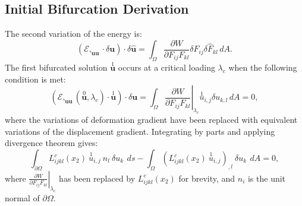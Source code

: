 \documentclass[11pt]{report}
\begin{document}
\begin{appendices}
  \chapter{Initial Bifurcation Derivation} \label{append_first_sol}

The second variation of the energy is:
\begin{equation} \label{eq:second_var}
(\mathcal{E},_{\mathbf{u} \mathbf{u}}\cdot \delta\mathbf{u}) \cdot \delta\hat{\mathbf{u}} = \int_\Omega  \frac{\partial W}{\partial F_{ij} F_{kl}} \delta F_{ij} \delta \hat{F}_{kl} \,dA.
\end{equation}
The first bifurcated solution $\overset{1}{\mathbf{u}}$ occurs at a critical loading $\lambda_c$ when the following condition is met:
\begin{equation}
(\mathcal{E},_{\mathbf{u} \mathbf{u}}(\overset{0}{\mathbf{u}}, \lambda_c) \cdot \overset{1}{\mathbf{u}}) \cdot \delta\mathbf{u} = \int_\Omega  \left. \frac{\partial W}{\partial F_{ij} F_{kl}} \right |_{\lambda_c} \overset{1}{u}_{i,j} \delta u_{k,l} \,dA = 0,
\end{equation}
where the variations of deformation gradient have been replaced with equivalent variations of the displacement gradient. Integrating by parts and applying divergence theorem gives:
\begin{equation} \label{eq:byparts}
\int_{\partial \Omega} L^c_{ijkl}(x_2) \: \overset{1}{u}_{i,j} \: n_l \:  \delta u_k \: \,ds - \int_{\Omega} \left ( L^c_{ijkl}(x_2) \: \overset{1}{u}_{i,j} \right )_{,l} \: \delta u_k \: \,dA = 0,
\end{equation}
where $\left. \frac{\partial W}{\partial F_{ij} F_{kl}} \right |_{\lambda_c}$ has been replaced by $L^c_{ijkl}(x_2)$ for brevity, and $n_{i}$ is the unit normal of $\partial \Omega$. 


\end{appendices}
\end{document}
